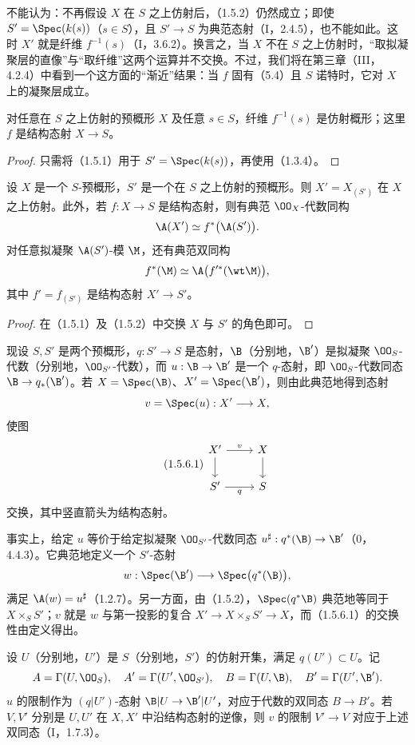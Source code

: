 不能认为：不再假设 $X$ 在 $S$ 之上仿射后，（1.5.2）仍然成立；即使 $S'=\Spec(k(s))$（$s\in S$），且 $S'\to S$ 为典范态射（I，2.4.5），也不能如此。这时 $X'$ 就是纤维 $f^{-1}(s)$（I，3.6.2）。换言之，当 $X$ 不在 $S$ 之上仿射时，“取拟凝聚层的直像”与“取纤维”这两个运算并不交换。不过，我们将在第三章（III，4.2.4）中看到一个这方面的“渐近”结果：当 $f$ 固有（5.4）且 $S$ 诺特时，它对 $X$ 上的凝聚层成立。

对任意在 $S$ 之上仿射的预概形 $X$ 及任意 $s\in S$，纤维 $f^{-1}(s)$ 是仿射概形；这里 $f$ 是结构态射 $X\to S$。
\begin{proof}
只需将（1.5.1）用于 $S'=\Spec(k(s))$，再使用（1.3.4）。
\end{proof}

设 $X$ 是一个 $S$-预概形，$S'$ 是一个在 $S$ 之上仿射的预概形。则 $X'=X_{(S')}$ 在 $X$ 之上仿射。此外，若 $f:X\to S$ 是结构态射，则有典范 $\OO_X$-代数同构
\[
\A(X')\simeq f^*\bigl(\A(S')\bigr).
\]
对任意拟凝聚 $\A(S')$-模 $\M$，还有典范双同构
\[
f^*(\M)\simeq\A\bigl(f'^*(\wt\M)\bigr),
\]
其中 $f'=f_{(S')}$ 是结构态射 $X'\to S'$。
\begin{proof}
在（1.5.1）及（1.5.2）中交换 $X$ 与 $S'$ 的角色即可。
\end{proof}

现设 $S,S'$ 是两个预概形，$q:S'\to S$ 是态射，$\B$（分别地，$\B'$）是拟凝聚 $\OO_S$-代数（分别地，$\OO_{S'}$-代数），而 $u:\B\to\B'$ 是一个 $q$-态射，即 $\OO_S$-代数同态 $\B\to q_*(\B')$。若
$X=\Spec(\B)$、$X'=\Spec(\B')$，则由此典范地得到态射
\[
v=\Spec(u):X'\longrightarrow X,
\]
使图
\begin{equation}\tag{1.5.6.1}
\begin{tikzcd}
X' \arrow[r,"v"] \arrow[d] & X \arrow[d]\\
S' \arrow[r,"q"'] & S
\end{tikzcd}
\end{equation}
交换，其中竖直箭头为结构态射。

事实上，给定 $u$ 等价于给定拟凝聚 $\OO_{S'}$-代数同态
$u^\sharp:q^*(\B)\to\B'$（0，4.4.3）。它典范地定义一个 $S'$-态射
\[
w:\Spec(\B')\longrightarrow\Spec\bigl(q^*(\B)\bigr),
\]
满足 $\A(w)=u^\sharp$（1.2.7）。另一方面，由（1.5.2），$\Spec(q^*\B)$ 典范地等同于 $X\times_SS'$；$v$ 就是 $w$ 与第一投影的复合
$X'\to X\times_SS'\to X$，而（1.5.6.1）的交换性由定义得出。

设 $U$（分别地，$U'$）是 $S$（分别地，$S'$）的仿射开集，满足 $q(U')\subset U$。记
\[
A=\Gamma(U,\OO_S),\quad A'=\Gamma(U',\OO_{S'}),\quad
B=\Gamma(U,\B),\quad B'=\Gamma(U',\B').
\]
$u$ 的限制作为 $(q|U')$-态射 $\B|U\to\B'|U'$，对应于代数的双同态 $B\to B'$。若 $V,V'$ 分别是 $U,U'$ 在 $X,X'$ 中沿结构态射的逆像，则 $v$ 的限制 $V'\to V$ 对应于上述双同态（I，1.7.3）。

